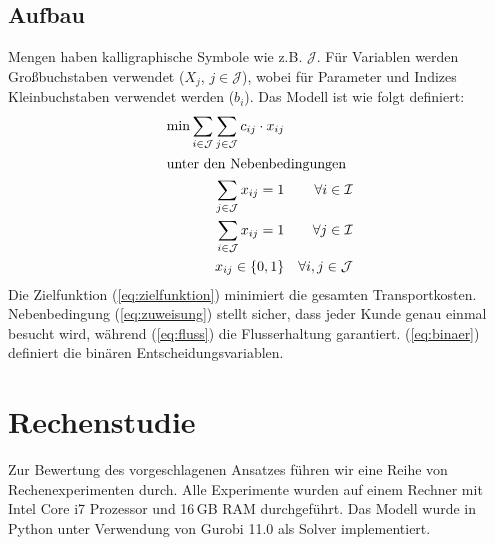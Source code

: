 \documentclass[11pt,a4paper]{article}
\begin{document}
\subsection{Aufbau}
\label{sec:aufbau}
Mengen haben kalligraphische Symbole wie z.B. $\mathcal{J}$.
Für Variablen werden Großbuchstaben verwendet ($X_j$, $j \in \mathcal{J}$), wobei für Parameter und Indizes Kleinbuchstaben verwendet werden ($b_i$).
Das Modell ist wie folgt definiert:
\begin{align}
	\label{eq:zielfunktion}
	\min \sum_{i \in \mathcal{J}} \sum_{j \in \mathcal{J}} c_{ij} \cdot x_{ij} & \\
	\intertext{unter den Nebenbedingungen}
	\label{eq:zuweisung}
	\sum_{j \in \mathcal{J}} x_{ij} = 1 && \forall i \in \mathcal{I} \\
	\label{eq:fluss}
	\sum_{i \in \mathcal{J}} x_{ij} = 1 && \forall j \in \mathcal{I} \\
	\label{eq:binaer}
	x_{ij} \in \{0, 1\} && \forall i, j \in \mathcal{J}
\end{align}
Die Zielfunktion (\ref{eq:zielfunktion}) minimiert die gesamten Transportkosten. Nebenbedingung (\ref{eq:zuweisung}) stellt sicher, dass jeder Kunde genau einmal besucht wird, während (\ref{eq:fluss}) die Flusserhaltung garantiert. (\ref{eq:binaer}) definiert die binären Entscheidungsvariablen.

\section{Rechenstudie}
\label{sec:rechenstudie}
Zur Bewertung des vorgeschlagenen Ansatzes führen wir eine Reihe von Rechenexperimenten durch. Alle Experimente wurden auf einem Rechner mit Intel Core i7 Prozessor und 16\,GB RAM durchgeführt. Das Modell wurde in Python unter Verwendung von Gurobi 11.0 als Solver implementiert.
\end{document}
